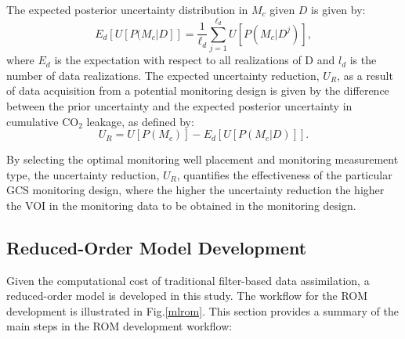 \documentclass[a4paper,fleqn]{cas-sc}
\begin{document}
The expected posterior uncertainty distribution in $M_c$ given $D$ is given by:
\begin{equation} \label{eq:2}
    E_d [U [ P(M_c \vert D]] = \frac{1}{\ell_d} \sum_{j=1}^{\ell_d} U [P (M_c \vert D^j) ] ,
\end{equation}
where $E_d$ is the expectation with respect to all realizations of D and $l_d$ is the number of data realizations. The expected uncertainty reduction, $U_R$, as a result of data acquisition from a potential monitoring design is given by the difference between the prior uncertainty and the expected posterior uncertainty in cumulative CO$_2$ leakage, as defined by:
\begin{equation} \label{eq:3}
    U_R = U[P(M_c)] - E_d [U [ P(M_c \vert D)]] .
\end{equation}

By selecting the optimal monitoring well placement and monitoring measurement type, the uncertainty reduction, $U_R$, quantifies the effectiveness of the particular GCS monitoring design, where the higher the uncertainty reduction the higher the VOI in the monitoring data to be obtained in the monitoring design.

\subsection{Reduced-Order Model Development}
Given the computational cost of traditional filter-based data assimilation, a reduced-order model is developed in this study. The workflow for the ROM development is illustrated in Fig.\ref{mlrom}. This section provides a summary of the main steps in the ROM development workflow:
\end{document}
